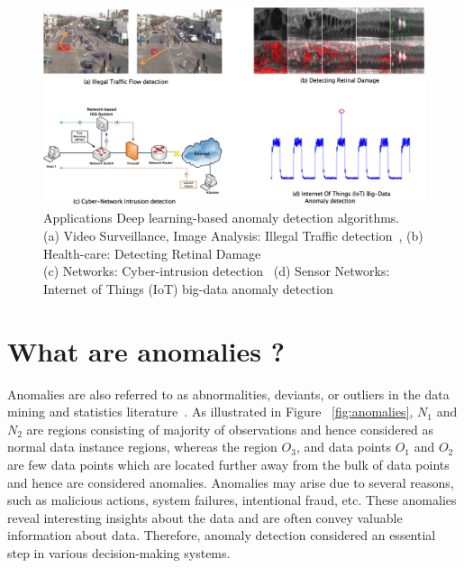 \begin{figure}[h]
\centering
\includegraphics[scale=0.5]{images/applications}
\captionsetup{justification=centering}
\caption{Applications Deep learning-based anomaly detection algorithms.\\
(a) Video Surveillance, Image Analysis: Illegal Traffic detection~\cite{xie2017real},  (b) Health-care: Detecting Retinal Damage~\cite{schlegl2017unsupervised}\\
(c) Networks: Cyber-intrusion detection~\cite{javaid2016deep}  (d) Sensor Networks: Internet of Things (IoT) big-data anomaly detection~\cite{mohammadi2017deep} }
\label{fig:applications}
\end{figure}



\section{ What are anomalies ?}
Anomalies  are also referred to as abnormalities, deviants, or outliers in the data mining and statistics literature~\cite{aggarwal2013introduction}. As illustrated in Figure ~\ref{fig:anomalies}, $N_{1}$ and $N_{2}$ are regions consisting of majority of observations and hence considered as normal data instance regions, whereas the region $O_{3}$, and data points  $O_{1}$ and $O_{2}$  are few data points which are located further away from the bulk of data points and hence are considered anomalies. Anomalies may arise due to several reasons, such as malicious actions, system failures, intentional fraud, etc. These anomalies reveal interesting insights about the data and are often convey valuable information about data. Therefore, anomaly detection considered an essential step in various decision-making systems.

